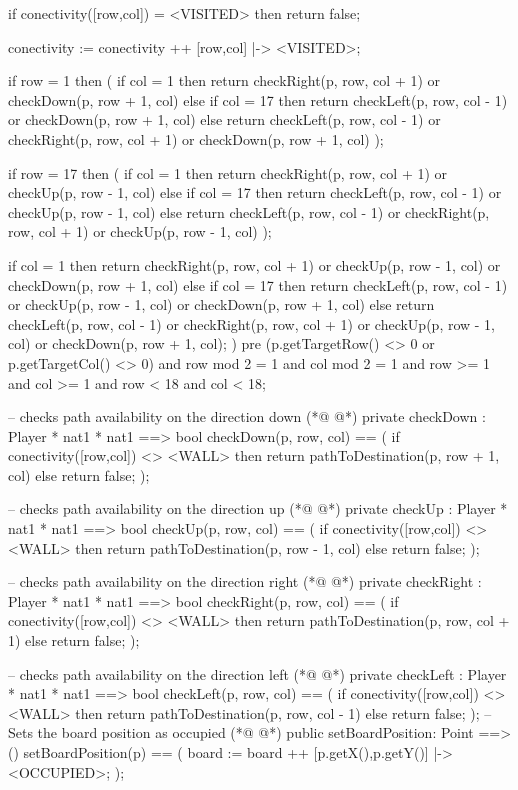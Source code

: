 \begin{vdmpp}[breaklines=true]
   if conectivity([row,col]) = <VISITED>
    then return false;
   
   conectivity := conectivity ++ {[row,col] |-> <VISITED>};
  
   if row = 1
   then
   (
    if col = 1
     then return checkRight(p, row, col + 1) or checkDown(p, row + 1, col)
    else if col = 17
     then return checkLeft(p, row, col - 1) or checkDown(p, row + 1, col)
    else return checkLeft(p, row, col - 1) or checkRight(p, row, col + 1) or checkDown(p, row + 1, col)
   );
   
   if row = 17
   then
   (
    if col = 1
     then return checkRight(p, row, col + 1) or checkUp(p, row - 1, col)
    else if col = 17
     then return checkLeft(p, row, col - 1) or checkUp(p, row - 1, col)
    else return checkLeft(p, row, col - 1) or checkRight(p, row, col + 1) or checkUp(p, row - 1, col)
   );
   
   if col = 1
   then return checkRight(p, row, col + 1) or checkUp(p, row - 1, col) or checkDown(p, row + 1, col)
   else if col = 17
   then return checkLeft(p, row, col - 1) or checkUp(p, row - 1, col) or checkDown(p, row + 1, col)
   else return checkLeft(p, row, col - 1) or checkRight(p, row, col + 1) or checkUp(p, row - 1, col) or checkDown(p, row + 1, col);
  )
  pre (p.getTargetRow() <> 0 or p.getTargetCol() <> 0) and row mod 2 = 1 and col mod 2 = 1 and row >= 1 and col >= 1 and row < 18 and col < 18;
  
  -- checks path availability on the direction down
(*@
\label{checkDown:238}
@*)
  private checkDown : Player * nat1 * nat1 ==> bool
  checkDown(p, row, col) ==
  (
   if conectivity([row,col]) <> <WALL>
    then return pathToDestination(p, row + 1, col)
   else return false;
  );
  
  -- checks path availability on the direction up
(*@
\label{checkUp:247}
@*)
  private checkUp : Player * nat1 * nat1 ==> bool
  checkUp(p, row, col) ==
  (
   if conectivity([row,col]) <> <WALL>
    then return pathToDestination(p, row - 1, col)
   else return false;
  );
  
  -- checks path availability on the direction right
(*@
\label{checkRight:256}
@*)
  private checkRight : Player * nat1 * nat1 ==> bool
  checkRight(p, row, col) ==
  (
   if conectivity([row,col]) <> <WALL>
    then return pathToDestination(p, row, col + 1)
   else return false;
  );
  
  -- checks path availability on the direction left
(*@
\label{checkLeft:265}
@*)
  private checkLeft : Player * nat1 * nat1 ==> bool
  checkLeft(p, row, col) ==
  (
   if conectivity([row,col]) <> <WALL>
    then return pathToDestination(p, row, col - 1)
   else return false;
  );
  -- Sets the board position as occupied
(*@
\label{setBoardPosition:273}
@*)
  public setBoardPosition: Point ==> () 
  setBoardPosition(p) ==
  (
   board := board ++ {[p.getX(),p.getY()] |-> <OCCUPIED>};
  );
  

\end{vdmpp}
